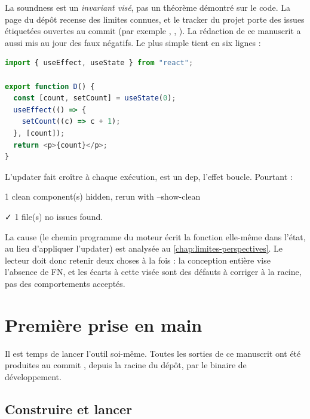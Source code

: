 \begin{piege}
  La soundness est un \emph{invariant visé}, pas un théorème démontré sur le
  code. La page  du dépôt recense des
  limites connues, et le tracker du projet porte des issues étiquetées
   ouvertes au commit \snapshotCommit{} (par exemple
  , , ). La rédaction de ce manuscrit a aussi
  mis au jour des faux négatifs. Le plus simple tient en six lignes :
\begin{lstlisting}[language=TypeScript,caption={Une boucle certaine que la CLI ne signale pas (\file{/tmp/ch01/updater_dep.tsx})},label={lst:introduction-fn-updater}]
import { useEffect, useState } from "react";

export function D() {
  const [count, setCount] = useState(0);
  useEffect(() => {
    setCount((c) => c + 1);
  }, [count]);
  return <p>{count}</p>;
}
\end{lstlisting}
  L'updater fait croître  à chaque exécution,  est un
  dep, l'effet boucle. Pourtant :
\begin{sortie}
   1 clean component(s) hidden, rerun with --show-clean

✓  1 file(s) no issues found.
\end{sortie}
  La cause (le chemin \og programme\fg{} du moteur écrit la fonction
   elle-même dans l'état, au lieu d'appliquer l'updater)
  est analysée au \cref{chap:limites-perspectives}. Le lecteur doit donc
  retenir deux choses à la fois : la conception entière vise l'absence de FN,
  et les écarts à cette visée sont des défauts à corriger à la racine, pas des
  comportements acceptés.
\end{piege}

\section{Première prise en main}
\label{sec:introduction-prise-en-main}

Il est temps de lancer l'outil soi-même. Toutes les sorties de ce manuscrit
ont été produites au commit \snapshotCommit{}, depuis la racine du dépôt, par
le binaire de développement.

\subsection{Construire et lancer}

